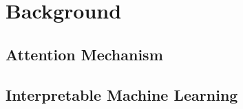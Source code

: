 \section{Background}


\subsection{Attention Mechanism}


\subsection{Interpretable Machine Learning}
